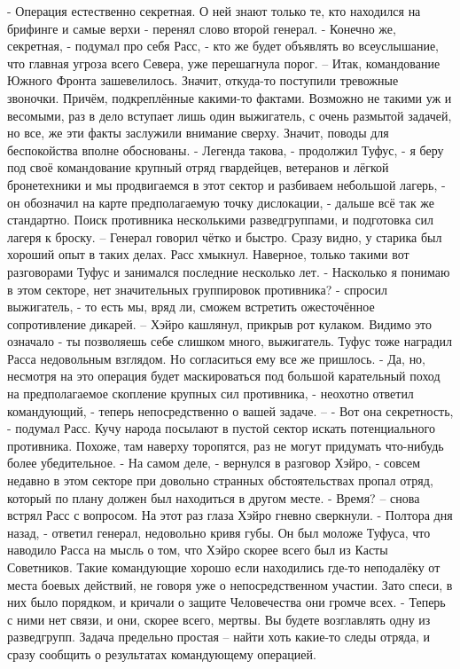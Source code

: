 \documentclass[a4paper, 12pt]{report}
\begin{document}
- Операция естественно секретная. О ней знают только те, кто находился на брифинге и самые верхи - перенял слово второй генерал.
- Конечно же, секретная, - подумал про себя Расс, - кто же будет объявлять во всеуслышание, что главная угроза всего Севера, уже перешагнула порог. –
Итак, командование Южного Фронта зашевелилось. Значит, откуда-то поступили тревожные звоночки. Причём, подкреплённые какими-то фактами. Возможно не такими уж и весомыми, раз в дело вступает лишь один выжигатель, с очень размытой задачей, но все, же эти факты заслужили внимание сверху. Значит, поводы для беспокойства вполне обоснованы.
- Легенда такова, - продолжил Туфус, - я беру под своё командование крупный отряд гвардейцев, ветеранов и лёгкой бронетехники и мы продвигаемся в этот сектор и разбиваем небольшой лагерь, - он обозначил на карте предполагаемую точку дислокации, - дальше всё так же стандартно. Поиск противника несколькими разведгруппами, и подготовка сил лагеря к броску. –
Генерал говорил чётко и быстро. Сразу видно, у старика был хороший опыт в таких делах. Расс хмыкнул. Наверное, только такими вот разговорами Туфус и занимался последние несколько лет.
- Насколько я понимаю в этом секторе, нет значительных группировок противника? - спросил выжигатель, - то есть мы, вряд ли, сможем встретить ожесточённое сопротивление дикарей. –
Хэйро кашлянул, прикрыв рот кулаком. Видимо это означало - ты позволяешь себе слишком много, выжигатель. Туфус тоже наградил Расса недовольным взглядом. Но согласиться ему все же пришлось.
- Да, но, несмотря на это операция будет маскироваться под большой карательный поход на предполагаемое скопление крупных сил противника, - неохотно ответил командующий, - теперь непосредственно о вашей задаче. –
- Вот она секретность, - подумал Расс. Кучу народа посылают в пустой сектор искать потенциального противника. Похоже, там наверху торопятся, раз не могут придумать что-нибудь более убедительное.
- На самом деле, - вернулся в разговор Хэйро, - совсем недавно в этом секторе при довольно странных обстоятельствах пропал отряд, который по плану должен был находиться в другом месте.
- Время? – снова встрял Расс с вопросом. На этот раз глаза Хэйро гневно сверкнули.
- Полтора дня назад, - ответил генерал, недовольно кривя губы. Он был моложе Туфуса, что наводило Расса на мысль о том, что Хэйро скорее всего был из Касты Советников. Такие командующие хорошо если находились где-то неподалёку от места боевых действий, не говоря уже о непосредственном участии. Зато спеси, в них было порядком, и кричали о защите Человечества они громче всех.
- Теперь с ними нет связи, и они, скорее всего, мертвы. Вы будете возглавлять одну из разведгрупп. Задача предельно простая – найти хоть какие-то следы отряда, и сразу сообщить о результатах командующему операцией.
\end{document}
